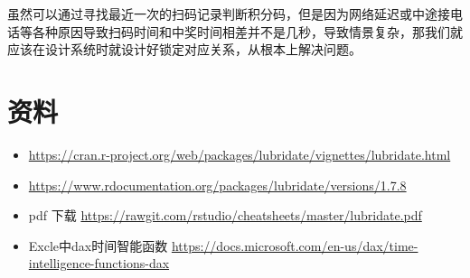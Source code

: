 \documentclass[
]{book}
\newenvironment{Shaded}{\begin{snugshade}}{\end{snugshade}}
\newcommand{\ControlFlowTok}[1]{\textcolor[rgb]{0.13,0.29,0.53}{\textbf{#1}}}
\newcommand{\DecValTok}[1]{\textcolor[rgb]{0.00,0.00,0.81}{#1}}
\newcommand{\FunctionTok}[1]{\textcolor[rgb]{0.00,0.00,0.00}{#1}}
\newcommand{\NormalTok}[1]{#1}
\newcommand{\OtherTok}[1]{\textcolor[rgb]{0.56,0.35,0.01}{#1}}
\newcommand{\SpecialCharTok}[1]{\textcolor[rgb]{0.00,0.00,0.00}{#1}}
\newcommand{\StringTok}[1]{\textcolor[rgb]{0.31,0.60,0.02}{#1}}
\begin{document}
\begin{Shaded}
\end{Shaded}

虽然可以通过寻找最近一次的扫码记录判断积分码，但是因为网络延迟或中途接电话等各种原因导致扫码时间和中奖时间相差并不是几秒，导致情景复杂，那我们就应该在设计系统时就设计好锁定对应关系，从根本上解决问题。

\hypertarget{ux8d44ux6599}{%
\section{资料}\label{ux8d44ux6599}}

\begin{itemize}
\item
  \url{https://cran.r-project.org/web/packages/lubridate/vignettes/lubridate.html}
\item
  \url{https://www.rdocumentation.org/packages/lubridate/versions/1.7.8}
\item
  pdf 下载 \url{https://rawgit.com/rstudio/cheatsheets/master/lubridate.pdf}
\item
  Excle中dax时间智能函数 \url{https://docs.microsoft.com/en-us/dax/time-intelligence-functions-dax}
\end{itemize}
\end{document}
